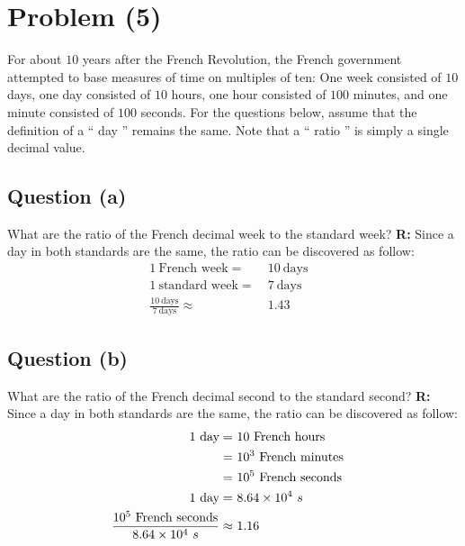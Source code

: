 \section{Problem (5)}
	For about $10$ years after the French Revolution, the French government attempted to base measures of time on multiples of ten: One week consisted of $10$ days, one day consisted of $10$ hours, one hour consisted of $100$ minutes, and one minute consisted of $100$ seconds. For the questions below, assume that the definition of a `` day '' remains the same. Note that a `` ratio '' is simply a single decimal value.

	\subsection{Question (a)}
		What are the ratio of the French decimal week to the standard week? \newline
		\textbf{R:} \newline
		Since a day in both standards are the same, the ratio can be discovered as follow:
		\begin{align}
			1 \ \text{French week} = \ & 10 \ \text{days} & \\
			1 \ \text{standard week} = \ & 7 \ \text{days} & \\
			\frac{10 \ \text{days}}{7 \ \text{days}}
			\approx \ &1.43&
		\end{align}

	\subsection{Question (b)}
		What are the ratio of the French decimal second to the standard second?
		\newline
		\textbf{R:} \newline
		Since a day in both standards are the same, the ratio can be discovered as follow:
		\begin{align}
			1 \ \text{day} = \ & 10 \ \text{French hours} & \notag \\
			= \ & 10^{3} \ \text{French minutes} & \notag \\
			= \ & 10^{5} \ \text{French seconds} & \\
			1 \ \text{day} = \ & 8.64 \times 10^{4} \ s & \\
			\frac{10^{5} \ \text{French seconds}}{8.64 \times 10^{4} \ s}
			\approx \ &1.16&
		\end{align}
